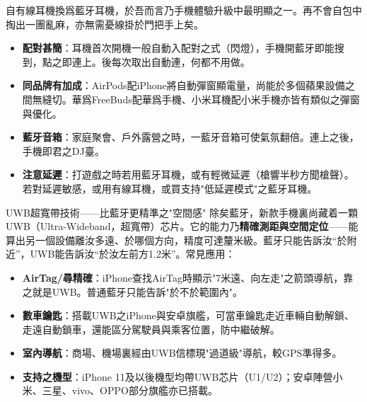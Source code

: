 
自有線耳機換爲藍牙耳機，於吾而言乃手機體驗升級中最明顯之一。再不會自包中掏出一團亂麻，亦無需憂線掛於門把手上矣。

\begin{itemize}
  \item \textbf{配對甚簡}：耳機首次開機一般自動入配對之式（閃燈），手機開藍牙即能搜到，點之即連上。後每次取出自動連，何都不用做。
  \item \textbf{同品牌有加成}：AirPods配iPhone將自動彈窗顯電量，尚能於多個蘋果設備之間無縫切。華爲FreeBuds配華爲手機、小米耳機配小米手機亦皆有類似之彈窗與優化。
  \item \textbf{藍牙音箱}：家庭聚會、戶外露營之時，一藍牙音箱可使氣氛翻倍。連上之後，手機即君之DJ臺。
  \item \textbf{注意延遲}：打遊戲之時若用藍牙耳機，或有輕微延遲（槍響半秒方聞槍聲）。若對延遲敏感，或用有線耳機，或買支持"低延遲模式"之藍牙耳機。
\end{itemize}

\begin{tcbinfo}{UWB超寬帶技術——比藍牙更精準之"空間感"}
除矣藍牙，新款手機裏尚藏着一顆UWB（Ultra-Wideband，超寬帶）芯片。它的能力乃\textbf{精確測距與空間定位}——能算出另一個設備離汝多遠、於哪個方向，精度可達釐米級。藍牙只能告訴汝“於附近”，UWB能告訴汝“於汝左前方1.2米”。常見應用：

\begin{itemize}
  \item \textbf{AirTag/尋精確}：iPhone查找AirTag時顯示"7米遠、向左走"之箭頭導航，靠之就是UWB。普通藍牙只能告訴"於不於範圍內"。
  \item \textbf{數車鑰匙}：搭載UWB之iPhone與安卓旗艦，可當車鑰匙走近車輛自動解鎖、走遠自動鎖車，還能區分駕駛員與乘客位置，防中繼破解。
  \item \textbf{室內導航}：商場、機場裏經由UWB信標現"過道級"導航，較GPS準得多。
  \item \textbf{支持之機型}：iPhone 11及以後機型均帶UWB芯片（U1/U2）；安卓陣營小米、三星、vivo、OPPO部分旗艦亦已搭載。
\end{itemize}

\end{tcbinfo}

